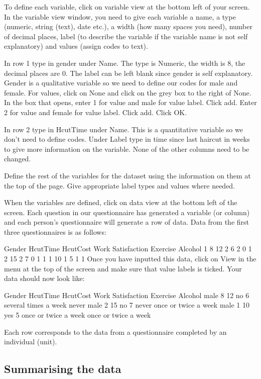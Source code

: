 
To define each variable, click on variable view at the bottom left of your screen. In the variable view window, you need to give each variable a name, a type (numeric, string (text), date etc.), a width (how many spaces you need), number of decimal places, label (to describe the variable if the variable name is not self explanatory) and values (assign codes to text).
 
In row 1 type in gender under Name. The type is Numeric, the width is 8, the decimal places are 0. The label can be left blank since gender is self explanatory. Gender is a qualitative variable so we need to define our codes for male and female. For values, click on None and click on the grey box to the right of None. In the box that opens, enter 1 for value and male for value label. Click add. Enter 2 for value and female for value label. Click add. Click OK.
 
In row 2 type in HcutTime under Name. This is a quantitative variable so we don’t need to define codes. Under Label type in time since last haircut in weeks to give more information on the variable. None of the other columns need to be changed.
 
Define the rest of the variables for the dataset using the information on them at the top of the page. Give appropriate label types and values where needed.
 
When the variables are defined, click on data view at the bottom left of the screen. Each question in our questionnaire has generated a variable (or column) and each person’s questionnaire will generate a row of data. Data from the first three questionnaires is as follows:
 
Gender
HcutTime
HcutCost
Work
Satisfaction
Exercise
Alcohol
1
8
12
2
6
2
0
1
2
15
2
7
0
1
1
1
10
1
5
1
1
Once you have inputted this data, click on View in the menu at the top of the screen and make sure that value labels is ticked. Your data should now look like:
 
Gender
HcutTime
HcutCost
Work
Satisfaction
Exercise
Alcohol
male
8
12
no
6
several times a week
never
male
2
15
no
7
never
once or twice a week
male
1
10
yes
5
once or twice a week
once or twice a week
 
Each row corresponds to the data from a questionnaire completed by an individual (unit).
 
\subsection{Summarising the data}
 
